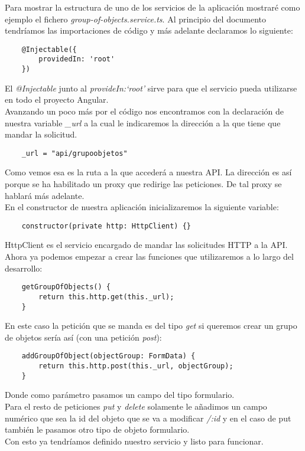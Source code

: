 Para mostrar la estructura de uno de los servicios de la aplicación mostraré como ejemplo el fichero \textit{group-of-objects.service.ts}. Al principio del documento tendríamos las importaciones de código y más adelante declaramos lo siguiente:
\begin{verbatim}
    @Injectable({
        providedIn: 'root'
    })
\end{verbatim}
El \textit{@Injectable} junto al \textit{provideIn:`root'} sirve para que el servicio pueda utilizarse en todo el proyecto Angular.
\\Avanzando un poco más por el código nos encontramos con la declaración de nuestra variable \textit{\_url} a la cual le indicaremos la dirección a la que tiene que mandar la solicitud.
\begin{verbatim}
    _url = "api/grupoobjetos"
\end{verbatim}
Como vemos esa es la ruta a la que accederá a nuestra API. La dirección es así porque se ha habilitado un proxy que redirige las peticiones. De tal proxy se hablará más adelante.
\\En el constructor de nuestra aplicación inicializaremos la siguiente variable:
\begin{verbatim}
    constructor(private http: HttpClient) {}
\end{verbatim}
HttpClient es el servicio encargado de mandar las solicitudes HTTP a la API.
\\Ahora ya podemos empezar a crear las funciones que utilizaremos a lo largo del desarrollo:
\begin{verbatim}
    getGroupOfObjects() {
        return this.http.get(this._url);
    }
\end{verbatim}
En este caso la petición que se manda es del tipo \textit{get} si queremos crear un grupo de objetos sería así (con una petición \textit{post}):
\begin{verbatim}
    addGroupOfObject(objectGroup: FormData) {
        return this.http.post(this._url, objectGroup);
    }
\end{verbatim}
Donde como parámetro pasamos un campo del tipo formulario.
\\Para el resto de peticiones \textit{put} y \textit{delete} solamente le añadimos un campo numérico que sea la id del objeto que se va a modificar \textit{/:id} y en el caso de put también le pasamos otro tipo de objeto formulario.
\\Con esto ya tendríamos definido nuestro servicio y listo para funcionar.